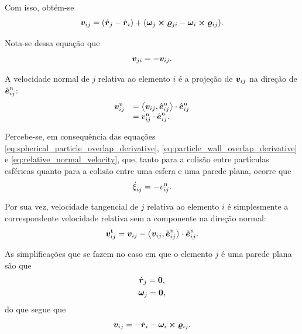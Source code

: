 Com isso, obtém-se
\begin{equation*}
	\relativeVelocityContactPointij = \pqty{\velocityj - \velocityi} + \pqty{\angularVelocityj\cross\contactVectorji - \angularVelocityi\cross\contactVectorij}.
\end{equation*}

Nota-se dessa equação que
\begin{equation*}
	{\bm{v}}_{j i} = - {\bm{v}}_{i j}.
\end{equation*}

A velocidade normal de \(j\) relativa ao elemento \(i\) é a projeção de \({\bm{v}}_{i j}\) na direção de \({\hat{\bm{e}}}_{i j}^{\text{n}}\):
\begin{equation} \label{eq:relative_normal_velocity}
	\begin{array}{rl}
		{\bm{v}}_{i j}^{\text{n}} & = \left\langle {\bm{v}}_{i j}, {\hat{\bm{e}}}_{i j}^{\text{n}} \right\rangle\cdot{\hat{\bm{e}}}_{i j}^{\text{n}} \\
		& = {v}_{i j}^{\text{n}}\cdot{\hat{\bm{e}}}_{i j}^{\text{n}}.
	\end{array}
\end{equation}

Percebe-se, em consequência das equações \eqref{eq:spherical_particle_overlap_derivative}, \eqref{eq:particle_wall_overlap_derivative} e \eqref{eq:relative_normal_velocity}, que, tanto para a colisão entre partículas esféricas quanto para a colisão entre uma esfera e uma parede plana, ocorre que
\begin{equation} \label{eq:overlap_derivative_and_normal_relative_velocity}
	\overlapDerivativeij = - \relativeNormalVelocityScalarij.
\end{equation}

Por sua vez, velocidade tangencial de \(j\) relativa ao elemento \(i\) é simplesmente a correspondente velocidade relativa sem a componente na direção normal:
\begin{equation*}
	{\bm{v}}_{i j}^{\text{t}} = {\bm{v}}_{i j} - \left\langle {\bm{v}}_{i j}, {\hat{\bm{e}}}_{i j}^{\text{n}} \right\rangle\cdot{\hat{\bm{e}}}_{i j}^{\text{n}}.
\end{equation*}

As simplificações que se fazem no caso em que o elemento \(j\) é uma parede plana são que 
\begin{gather*}
	\velocityj = \nullVector, \\
	\angularVelocityj = \nullVector,
\end{gather*}
do que segue que
\begin{equation*}
	\relativeVelocityContactPointij = - \velocityi - \angularVelocityi\cross\contactVectorij.
\end{equation*}


